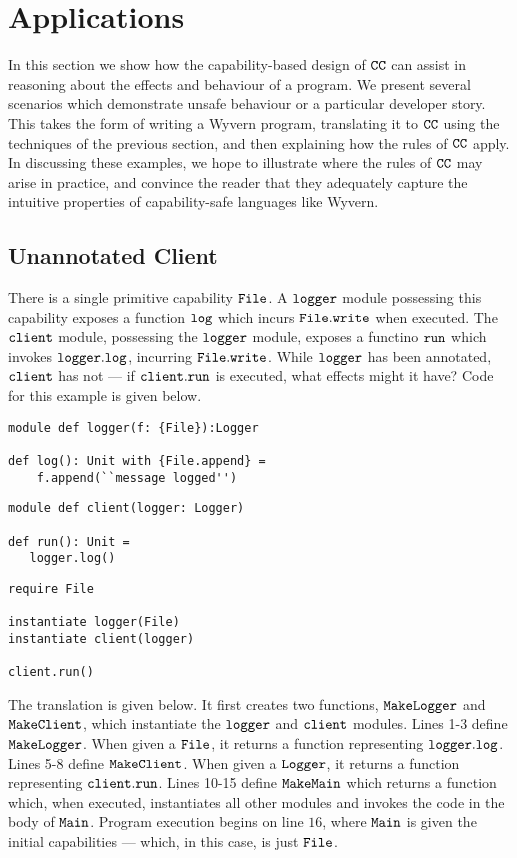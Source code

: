 \section{Applications}
\label{s:app}

In this section we show how the capability-based design of $\mathtt{CC}$ can assist in reasoning about the effects and behaviour of a program. We present several scenarios which demonstrate unsafe behaviour or a particular developer story. This takes the form of writing a Wyvern program, translating it to $\mathtt{CC}$ using the techniques of the previous section, and then explaining how the rules of $\mathtt{CC}$ apply. In discussing these examples, we hope to illustrate where the rules of $\mathtt{CC}$ may arise in practice, and convince the reader that they adequately capture the intuitive properties of capability-safe languages like Wyvern.

\subsection{Unannotated Client}

There is a single primitive capability $\mathtt{File}$. A $\mathtt{logger}$ module possessing this capability exposes a function $\mathtt{log}$ which incurs $\mathtt{File.write}$ when executed. The $\mathtt{client}$ module, possessing the $\mathtt{logger}$ module, exposes a functino $\mathtt{run}$ which invokes $\mathtt{logger.log}$, incurring $\mathtt{File.write}$. While $\mathtt{logger}$ has been annotated, $\mathtt{client}$ has not --- if $\mathtt{client.run}$ is executed, what effects might it have? Code for this example is given below. 

\begin{lstlisting}
module def logger(f: {File}):Logger

def log(): Unit with {File.append} =
    f.append(``message logged'')
\end{lstlisting}

\begin{lstlisting}
module def client(logger: Logger)

def run(): Unit =
   logger.log()
\end{lstlisting}

\begin{lstlisting}
require File

instantiate logger(File)
instantiate client(logger)

client.run()
\end{lstlisting}

The translation is given below. It first creates two functions, $\mathtt{MakeLogger}$ and $\mathtt{MakeClient}$, which instantiate the $\mathtt{logger}$ and $\mathtt{client}$ modules. Lines 1-3 define $\mathtt{MakeLogger}$. When given a $\mathtt{File}$, it returns a function representing $\mathtt{logger.log}$. Lines 5-8 define $\mathtt{MakeClient}$. When given a $\mathtt{Logger}$, it returns a function representing $\mathtt{client.run}$. Lines 10-15 define $\mathtt{MakeMain}$ which returns a function which, when executed, instantiates all other modules and invokes the code in the body of $\mathtt{Main}$. Program execution begins on line $16$, where $\mathtt{Main}$ is given the initial capabilities --- which, in this case, is just $\mathtt{File}$.

